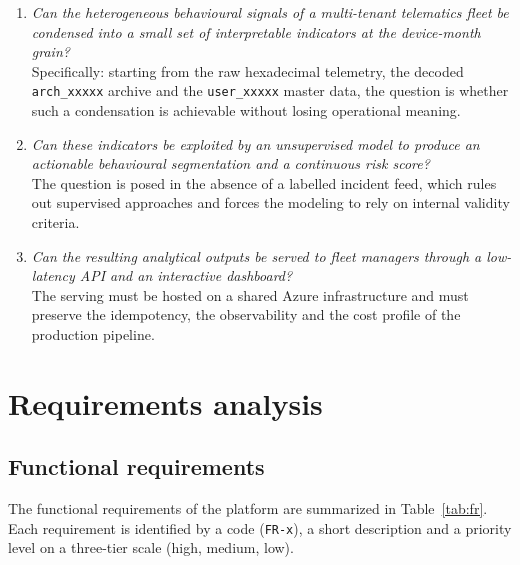 \begin{enumerate}
    \item[\textbf{RQ1}] \emph{Can the heterogeneous behavioural signals of a multi-tenant telematics fleet be condensed into a small set of interpretable indicators at the device-month grain?}\\
    Specifically: starting from the raw hexadecimal telemetry, the decoded \texttt{arch\_xxxxx} archive and the \texttt{user\_xxxxx} master data, the question is whether such a condensation is achievable without losing operational meaning.
    \item[\textbf{RQ2}] \emph{Can these indicators be exploited by an unsupervised model to produce an actionable behavioural segmentation and a continuous risk score?}\\
    The question is posed in the absence of a labelled incident feed, which rules out supervised approaches and forces the modeling to rely on internal validity criteria.
    \item[\textbf{RQ3}] \emph{Can the resulting analytical outputs be served to fleet managers through a low-latency API and an interactive dashboard?}\\
    The serving must be hosted on a shared Azure infrastructure and must preserve the idempotency, the observability and the cost profile of the production pipeline.
\end{enumerate}

\section{Requirements analysis}

\subsection{Functional requirements}
The functional requirements of the platform are summarized in Table~\ref{tab:fr}. Each requirement is identified by a code (\texttt{FR-x}), a short description and a priority level on a three-tier scale (high, medium, low).

